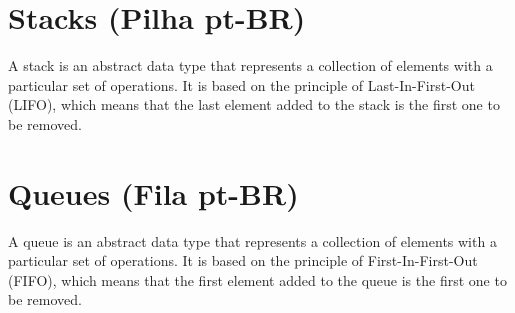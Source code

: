\documentclass{article}
\begin{document}
\section{Stacks (Pilha pt-BR)} 

A stack is an abstract data type that represents a collection of elements with a particular set of operations. It is based on the principle of Last-In-First-Out (LIFO), which means that the last element added to the stack is the first one to be removed.

\section{Queues (Fila pt-BR)}

A queue is an abstract data type that represents a collection of elements with a particular set of operations. It is based on the principle of First-In-First-Out (FIFO), which means that the first element added to the queue is the first one to be removed.



% 
\end{document}
